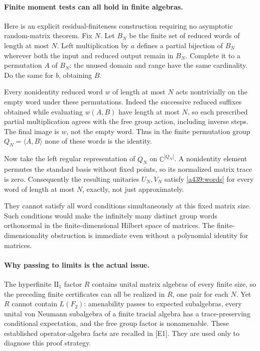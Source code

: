 \documentclass[11pt]{article}
\begin{document}
\paragraph{Finite moment tests can all hold in finite algebras.}
Here is an explicit residual-finiteness construction requiring
no asymptotic random-matrix theorem. Fix $N$. Let $B_N$ be
the finite set of reduced words of length at most $N$.
Left multiplication by $a$ defines a partial bijection of
$B_N$ wherever both the input and reduced output remain in
$B_N$. Complete it to a permutation $A$ of $B_N$: the
unused domain and range have the same cardinality.
Do the same for $b$, obtaining $B$.

Every nonidentity reduced word $w$ of length at most $N$
acts nontrivially on the empty word under these permutations.
Indeed the successive reduced suffixes obtained while
evaluating $w(A,B)$ have length at most $N$, so each
prescribed partial multiplication agrees with the free
group action, including inverse steps. The final image
is $w$, not the empty word. Thus in the finite permutation
group $Q_N=\langle A,B\rangle$ none of these words is
the identity.

Now take the left regular representation of $Q_N$ on
$\mathbb C^{|Q_N|}$. A nonidentity element permutes the
standard basis without fixed points, so its normalized
matrix trace is zero. Consequently the resulting unitaries
$U_N,V_N$ satisfy \eqref{a439:words} for every word of
length at most $N$, exactly, not just approximately.

They cannot satisfy all word conditions simultaneously
at this fixed matrix size. Such conditions would make
the infinitely many distinct group words orthonormal in
the finite-dimensional Hilbert space of matrices. The
finite-dimensionality obstruction is immediate even
without a polynomial identity for matrices.

\paragraph{Why passing to limits is the actual issue.}
The hyperfinite $\mathrm{II}_1$ factor $R$ contains unital
matrix algebras of every finite size, so the preceding
finite certificates can all be realized in $R$, one
pair for each $N$. Yet $R$ cannot contain $L(F_2)$:
amenability passes to expected subalgebras, every unital
von Neumann subalgebra of a finite tracial algebra has
a trace-preserving conditional expectation, and the
free group factor is nonamenable. These established
operator-algebra facts are recalled in [E1]. They are
used only to diagnose this proof strategy.
\end{document}
